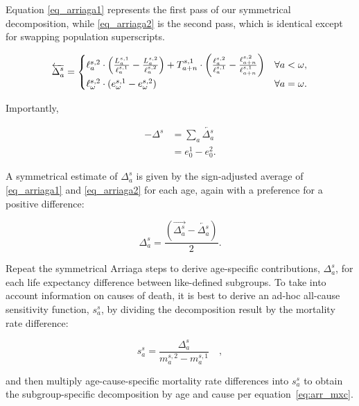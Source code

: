 \documentclass[12pt, sn-apa,pdflatex,letterpaper]{sn-jnl}
\begin{document}
Equation \eqref{eq_arriaga1} represents the first pass of our symmetrical decomposition, while \eqref{eq_arriaga2} is the second pass, which is identical except for swapping population superscripts.

\begin{equation}
\label{eq_arriaga2}
 \overleftarrow{\Delta_a^s} = \begin{cases}\ell_a^{s,2} \cdot \left( \frac{L_a^{s,1}}{\ell_a^{s,1}} - \frac{L_a^{s,2}}{\ell_a^{s,2}}\right)+T_{a+n}^{s,1}\cdot\left(\frac{\ell_a^{s,2}}{\ell_a^{s,1}} - \frac{\ell_{a+n}^{s,2}}{\ell_{a+n}^{s,1}}\right)  & \text{$ \forall a < \omega$}\textrm{,}  \\
  \ell_\omega ^{s,2} \cdot (e_\omega^{s,1} -e_\omega^{s,2} ) & \text{$\forall a = \omega $}\textrm{.}
  \end{cases}
\end{equation}

Importantly,

\begin{align}
\label{eq_sum2}
 -\Delta^s &= \sum_a \overleftarrow{\Delta_a^s} \\
 &= e_0^1 - e_0^2 \nonumber\textrm{.}
\end{align}

A symmetrical estimate of $\Delta_a^s$ is given by the sign-adjusted average of \eqref{eq_arriaga1} and \eqref{eq_arriaga2} for each age, again with a preference for a positive difference:

\begin{equation}
\label{eq_arriaga3}
\Delta_a^s = \frac{\left(\overrightarrow{\Delta_a^s} -  \overleftarrow{\Delta_a^s}\right)}{2}\textrm{.}
\end{equation}

Repeat the symmetrical Arriaga steps to derive age-specific contributions, $\Delta_a^s$, for each life expectancy difference between like-defined subgroups. To take into account information on causes of death, it is best to derive an ad-hoc all-cause sensitivity function, $s_a^s$, by dividing the decomposition result by the mortality rate difference:

\begin{equation}
\label{eq:arr_sen}
s_a^s = \frac{\Delta_a^s}{m_{a}^{s,2} - m_{a}^{s,1}} \quad\mathrm{,}
\end{equation}

\noindent and then multiply age-cause-specific mortality rate differences into $s_a^s$ to obtain the subgroup-specific decomposition by age and cause per equation~\eqref{eq:arr_mxc}.
\end{document}
